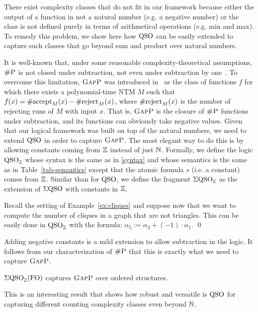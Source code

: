
There exist complexity classes that do not fit in our framework because either the output of a function in not a natural number (e.g. a negative number) or the class is not defined purely in terms of arithmetical operations (e.g. min and max).
To remedy this problem, we show here how ${\rm QSO}$ can be easily extended  to capture such classes that go beyond sum and product over natural numbers. 

It is well-known that, under some reasonable complexity-theoretical assumptions, $\text{\sc \#P}$ is not closed under subtraction, not even under subtraction by one~\cite{OH93}.
To overcome this limitation, $\text{\sc GapP}$ was introduced in~\cite{FFK94} as the class of functions $f$ for which there exists a polynomial-time NTM $M$ such that $f(x) = \text{\rm \#accept}_M(x) - \text{\rm \#reject}_M(x)$, where  $\text{\rm \#reject}_M(x)$ is the number of rejecting runs of $M$ with input $x$.
That is, $\text{\sc GapP}$ is the closure of $\text{\sc \#P}$ functions under subtraction, and its functions can obviously take negative values.
Given that our logical framework was built on top of the natural numbers, we need to extend ${\rm QSO}$ in order to capture $\text{\sc GapP}$. 
The most elegant way to do this is by allowing constants coming from $\mathbb{Z}$ instead of just $\mathbb{N}$. 
Formally, we define the logic ${\rm QSO}_{\mathbb{Z}}$ whose syntax is the same as in \eqref{syntax} and whose semantics is the same as in Table~\ref{tab-semantics} except that the atomic formula $s$ (i.e. a constant) comes from $\mathbb{Z}$.  
Similar than for ${\rm QSO}$, we define the fragment $\Sigma{\rm QSO}_{\mathbb{Z}}$ as the extension of $\Sigma{\rm QSO}$ with constants in $\mathbb{Z}$.
\begin{exa}
	Recall the setting of Example~\ref{ex:cliques} and suppose now that we want to compute the number of cliques in a graph that are not triangles. This can be easily done in ${\rm QSO}_{\mathbb{Z}}$ with the formula:
	$
	\alpha_5 :=	\alpha_2 + (-1) \cdot \alpha_1. 
	$ \qed
\end{exa}
Adding negative constants is a mild extension to allow subtraction in the logic. 
It follows from our characterization of $\text{\sc \#P}$ that this is exactly what we need to capture  $\text{\sc GapP}$.
\begin{cor} \label{prop:capture-gapp}
	$\Sigma{\rm QSO}_{\mathbb{Z}}({\rm FO})$ captures $\text{\sc GapP}$ over ordered structures.
\end{cor}
This is an interesting result that shows how robust and versatile is ${\rm QSO}$ for capturing different counting complexity classes even beyond $\mathbb{N}$.

